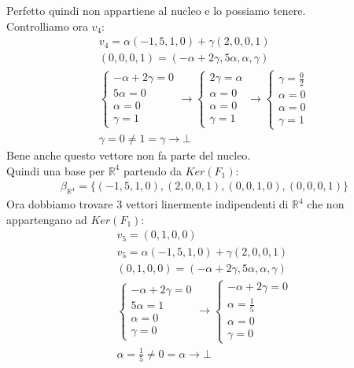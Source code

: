 \documentclass{article}
\begin{document}
Perfetto quindi non appartiene al nucleo e lo possiamo tenere.
\\Controlliamo ora $v_4$:
\begin{align*}
    v_4=\alpha(-1,5,1,0)+\gamma(2,0,0,1) \\
    (0,0,0,1)=(-\alpha+2\gamma,5\alpha,\alpha,\gamma) \\
    \begin{cases}
        -\alpha+2\gamma=0 \\
        5\alpha=0 \\
        \alpha=0 \\
        \gamma=1
    \end{cases}
    \to     \begin{cases}
        2\gamma=\alpha \\
        \alpha=0 \\
        \alpha=0 \\
        \gamma=1
    \end{cases}
    \to \begin{cases}
        \gamma=\frac{0}{2} \\
        \alpha=0 \\
        \alpha=0 \\
        \gamma=1
    \end{cases} \\
    \gamma=0\neq 1=\gamma \to \bot
\end{align*}
Bene anche questo vettore non fa parte del nucleo.
\\Quindi una base per $\mathbb{R}^4$ partendo da $Ker(F_1)$:
\begin{align*}
    \beta_{\mathbb{R}^4}=\{(-1,5,1,0),(2,0,0,1),(0,0,1,0),(0,0,0,1)\}
\end{align*}
Ora dobbiamo trovare 3 vettori linermente indipendenti di $\mathbb{R}^4$ che non appartengano ad $Ker(F_1)$:
\begin{align*}
    v_5=(0,1,0,0) \\
    v_5=\alpha(-1,5,1,0)+\gamma(2,0,0,1) \\
    (0,1,0,0)=(-\alpha+2\gamma,5\alpha,\alpha,\gamma) \\
    \begin{cases}
        -\alpha+2\gamma=0 \\
        5\alpha=1 \\
        \alpha=0 \\
        \gamma=0
    \end{cases}
    \to    \begin{cases}
        -\alpha+2\gamma=0 \\
        \alpha=\frac{1}{5} \\
        \alpha=0 \\
        \gamma=0
    \end{cases}\\
    \alpha=\frac{1}{5}\neq 0 =\alpha \to \bot
\end{align*}
\end{document}
